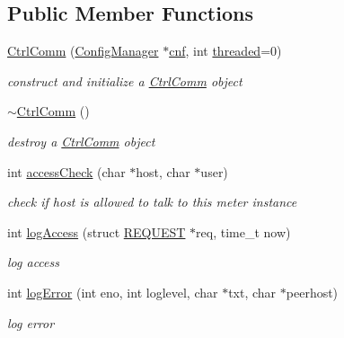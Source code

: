 \subsection*{Public Member Functions}
\begin{DoxyCompactItemize}
\item 
\hyperlink{classCtrlComm_a557582fa33a0cbc4919dbfecfd1a09ac}{Ctrl\+Comm} (\hyperlink{classConfigManager}{Config\+Manager} $\ast$\hyperlink{classQualityManagerComponent_a021f9991b72d52f295b87d8a5b02046a}{cnf}, int \hyperlink{classQualityManagerComponent_add2cffa903c310563f8b999cdecd1953}{threaded}=0)
\begin{DoxyCompactList}\small\item\em construct and initialize a \hyperlink{classCtrlComm}{Ctrl\+Comm} object \end{DoxyCompactList}\item 
\mbox{\label{classCtrlComm_a3aa5c9bb13b59ab3901010e1a20484f4}} 
\hyperlink{classCtrlComm_a3aa5c9bb13b59ab3901010e1a20484f4}{$\sim$\+Ctrl\+Comm} ()
\begin{DoxyCompactList}\small\item\em destroy a \hyperlink{classCtrlComm}{Ctrl\+Comm} object \end{DoxyCompactList}\item 
int \hyperlink{classCtrlComm_ac7b0ee75bc62a2fab69022e0ce1f507d}{access\+Check} (char $\ast$host, char $\ast$user)
\begin{DoxyCompactList}\small\item\em check if host is allowed to talk to this meter instance \end{DoxyCompactList}\item 
\mbox{\label{classCtrlComm_a2e823214be951b2149207952c7cffab8}} 
int \hyperlink{classCtrlComm_a2e823214be951b2149207952c7cffab8}{log\+Access} (struct \hyperlink{structREQUEST}{R\+E\+Q\+U\+E\+ST} $\ast$req, time\+\_\+t now)
\begin{DoxyCompactList}\small\item\em log access \end{DoxyCompactList}\item 
\mbox{\label{classCtrlComm_a7f8b660b362c7507989444f79707fcee}} 
int \hyperlink{classCtrlComm_a7f8b660b362c7507989444f79707fcee}{log\+Error} (int eno, int loglevel, char $\ast$txt, char $\ast$peerhost)
\begin{DoxyCompactList}\small\item\em log error \end{DoxyCompactList}\item 

\end{DoxyCompactItemize}
